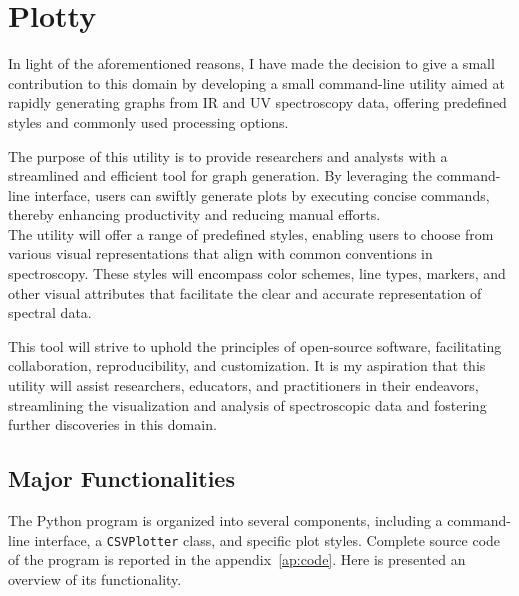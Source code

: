\documentclass[../Master.tex]{subfiles}
\begin{document}
\section{Plotty}\label{sec:plotty}

In light of the aforementioned reasons, I have made the decision to give a small contribution to this domain by developing a small command-line utility aimed at rapidly generating graphs from IR and UV spectroscopy data, offering predefined styles and commonly used processing options.

The purpose of this utility is to provide researchers and analysts with a streamlined and efficient tool for graph generation. By leveraging the command-line interface, users can swiftly generate plots by executing concise commands, thereby enhancing productivity and reducing manual efforts. \\
The utility will offer a range of predefined styles, enabling users to choose from various visual representations that align with common conventions in spectroscopy. These styles will encompass color schemes, line types, markers, and other visual attributes that facilitate the clear and accurate representation of spectral data.

This tool will strive to uphold the principles of open-source software, facilitating collaboration, reproducibility, and customization. It is my aspiration that this utility will assist researchers, educators, and practitioners in their endeavors, streamlining the visualization and analysis of spectroscopic data and fostering further discoveries in this domain.

\subsection{Major Functionalities}

The Python program is organized into several components, including a command-line interface, a \texttt{CSVPlotter} class, and specific plot styles.
Complete source code of the program is reported in the appendix\ \ref{ap:code}. Here is presented an overview of its functionality.
\end{document}
